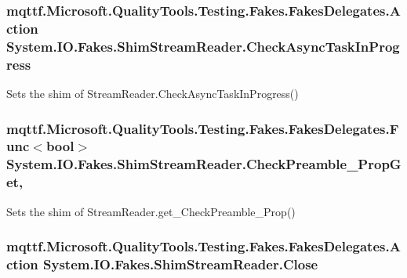 \hypertarget{class_system_1_1_i_o_1_1_fakes_1_1_shim_stream_reader_a405dab20a78e869949b7e140117bfce0}{
\subsubsection[{Check\-Async\-Task\-In\-Progress}]{\setlength{\rightskip}{0pt plus 5cm}mqttf.\-Microsoft.\-Quality\-Tools.\-Testing.\-Fakes.\-Fakes\-Delegates.\-Action System.\-I\-O.\-Fakes.\-Shim\-Stream\-Reader.\-Check\-Async\-Task\-In\-Progress\hspace{0.3cm}{\ttfamily [set]}}}\label{class_system_1_1_i_o_1_1_fakes_1_1_shim_stream_reader_a405dab20a78e869949b7e140117bfce0}


Sets the shim of Stream\-Reader.\-Check\-Async\-Task\-In\-Progress()

\hypertarget{class_system_1_1_i_o_1_1_fakes_1_1_shim_stream_reader_a7805e159392bd0dba4a7a1909475825d}{
\subsubsection[{Check\-Preamble\-\_\-\-Prop\-Get}]{\setlength{\rightskip}{0pt plus 5cm}mqttf.\-Microsoft.\-Quality\-Tools.\-Testing.\-Fakes.\-Fakes\-Delegates.\-Func$<$bool$>$ System.\-I\-O.\-Fakes.\-Shim\-Stream\-Reader.\-Check\-Preamble\-\_\-\-Prop\-Get\hspace{0.3cm}{\ttfamily [get]}, {\ttfamily [set]}}}\label{class_system_1_1_i_o_1_1_fakes_1_1_shim_stream_reader_a7805e159392bd0dba4a7a1909475825d}


Sets the shim of Stream\-Reader.\-get\-\_\-\-Check\-Preamble\-\_\-\-Prop()

\hypertarget{class_system_1_1_i_o_1_1_fakes_1_1_shim_stream_reader_a3456303d294816bae37b0bd0b3798e5e}{
\subsubsection[{Close}]{\setlength{\rightskip}{0pt plus 5cm}mqttf.\-Microsoft.\-Quality\-Tools.\-Testing.\-Fakes.\-Fakes\-Delegates.\-Action System.\-I\-O.\-Fakes.\-Shim\-Stream\-Reader.\-Close\hspace{0.3cm}{\ttfamily [set]}}}\label{class_system_1_1_i_o_1_1_fakes_1_1_shim_stream_reader_a3456303d294816bae37b0bd0b3798e5e}


